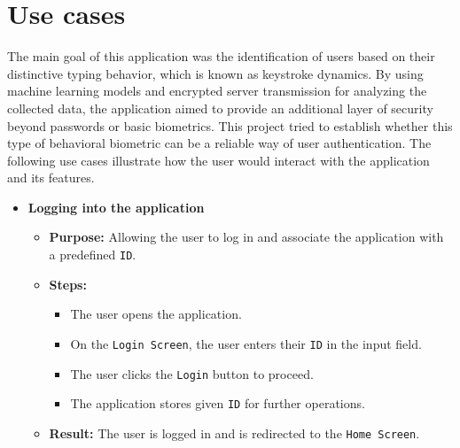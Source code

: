 
\section{Use cases}
The main goal of this application was the identification of users based on their distinctive typing behavior, which is known as keystroke dynamics. By using machine learning models and encrypted server transmission for analyzing the collected data, the application aimed to provide an additional layer of security beyond passwords or basic biometrics. This project tried to establish whether this type of behavioral biometric can be a reliable way of user authentication. \newline
The following use cases illustrate how the user would interact with the application and its features.

\begin{itemize}
	\item \textbf{Logging into the application}
	\begin{itemize}
		\item \textbf{Purpose:} Allowing the user to log in and associate the application with a predefined \texttt{ID}.
		\item \textbf{Steps:}
		\begin{itemize}
			\item The user opens the application.
			\item On the \texttt{Login Screen}, the user enters their \texttt{ID} in the input field.
			\item The user clicks the \texttt{Login} button to proceed.
			\item The application stores given \texttt{ID} for further operations.
		\end{itemize}
		\item \textbf{Result:} The user is logged in and is redirected to the \texttt{Home Screen}.
	\end{itemize}
	

\end{itemize}
